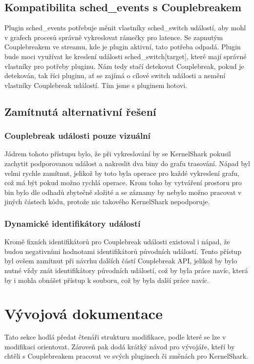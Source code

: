 \subsection{Kompatibilita sched\_events s Couplebreakem}
Plugin sched\_events potřebuje měnit vlastníky sched\_switch událostí, aby mohl v grafech procesů správně vykreslovat rámečky pro latence. Se zapnutým Couplebreakem ve streamu, kde je plugin aktivní, tato potřeba odpadá. Plugin bude moci využívat ke kreslení události sched\_switch[target], které mají správné vlastníky pro potřeby pluginu. Nám tedy stačí detekovat Couplebreak, pokud je detekován, tak říci pluginu, ať se zajímá o cílové switch události a nemění vlastníky Couplebreak událostí. Tím jsme s pluginem hotovi.

\subsection{Zamítnutá alternativní řešení}

\subsubsection*{Couplebreak události pouze vizuální}
Jádrem tohoto přístupu bylo, že při vykreslování by se KernelShark pokusil zachytit podporovanou událost a nakreslit dva biny do grafu trasování. Nápad byl velmi rychle zamítnut, jelikož by toto byla operace pro každé vykreslení grafu, což má být pokud možno rychlá operace. Krom toho by vytváření prostoru pro bin bylo dle odhadů zbytečně složité a se záznamy by nebylo možno pracovat v jiných částech kódu, protože nic takového KernelShark nepodporuje.

\subsubsection*{Dynamické identifikátory událostí}
Kromě fixních identifikátorů pro Couplebreak události existoval i nápad, že budou negativními hodnotami identifikátorů původních událostí. Tento přístup byl ovšem zamítnut při návrhu dalších částí Couplebreak API, jelikož by bylo nutné vždy znát identifikátory původních událostí, což by byla práce navíc, která by i mohla obnášet přístup k souboru, což by byla další práce navíc.

\section{Vývojová dokumentace}
Tato sekce hodlá předat čtenáři strukturu modifikace, podle které se lze v modifikaci orientovat. Zároveň pak dodá krátký návod pro vývojáře, kteří by chtěli s Couplebreakem pracovat ve svých pluginech či změnách pro KernelShark.

